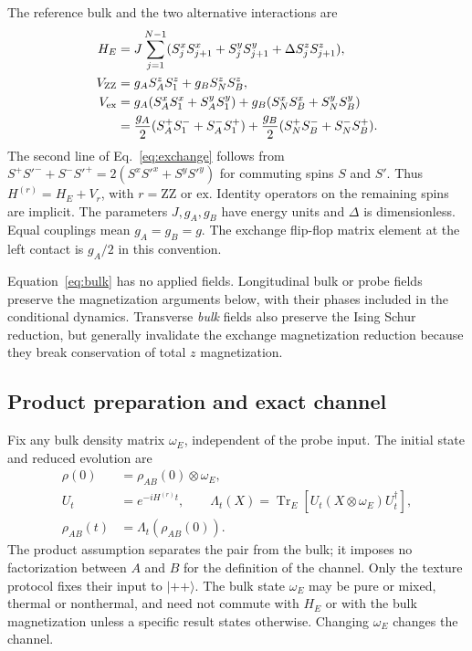 \documentclass[11pt,a4paper]{article}
\newcommand{\ket}[1]{\lvert #1\rangle}
\newcommand{\Tr}{\operatorname{Tr}}
\newcommand{\ZZ}{\mathrm{ZZ}}
\newcommand{\ex}{\mathrm{ex}}
\begin{document}
The reference bulk and the two alternative interactions are
\begin{align}
 H_E&=J\sum_{j=1}^{N-1}
 (S_j^xS_{j+1}^x+S_j^yS_{j+1}^y+\Delta S_j^zS_{j+1}^z),
 \label{eq:bulk}\\
 V_{\ZZ}&=g_A S_A^zS_1^z+g_B S_N^zS_B^z,
 \label{eq:ising}\\
 V_{\ex}&=g_A(S_A^xS_1^x+S_A^yS_1^y)
          +g_B(S_N^xS_B^x+S_N^yS_B^y)\notag\\
 &=\frac{g_A}{2}(S_A^+S_1^-+S_A^-S_1^+)
   +\frac{g_B}{2}(S_N^+S_B^-+S_N^-S_B^+).
 \label{eq:exchange}
\end{align}
The second line of Eq.~\eqref{eq:exchange} follows from
$S^+S'^-+S^-S'^+=2(S^xS'^x+S^yS'^y)$ for commuting spins $S$ and $S'$.
Thus $H^{(r)}=H_E+V_r$, with $r=\ZZ$ or $\ex$.
Identity operators on the remaining spins are implicit. The parameters
$J,g_A,g_B$ have energy units and $\Delta$ is dimensionless. Equal
couplings mean $g_A=g_B=g$. The exchange flip-flop matrix element at
the left contact is $g_A/2$ in this convention.

Equation~\eqref{eq:bulk} has no applied fields. Longitudinal bulk or probe
fields preserve the magnetization arguments below, with their phases
included in the conditional dynamics. Transverse \emph{bulk} fields also
preserve the Ising Schur reduction, but generally invalidate the exchange
magnetization reduction because they break conservation of total
$z$ magnetization.

\subsection{Product preparation and exact channel}

Fix any bulk density matrix $\omega_E$, independent of the probe input.
The initial state and reduced evolution are
\begin{align}
 \rho(0)&=\rho_{AB}(0)\otimes\omega_E,\\
 U_t&=e^{-iH^{(r)}t},\qquad
 \Lambda_t(X)=\Tr_E[U_t(X\otimes\omega_E)U_t^\dagger],
 \label{eq:channel}\\
 \rho_{AB}(t)&=\Lambda_t(\rho_{AB}(0)).
\end{align}
The product assumption separates the pair from the bulk; it imposes no
factorization between $A$ and $B$ for the definition of the channel.
Only the texture protocol fixes their input to $\ket{++}$.
The bulk state $\omega_E$ may be pure or mixed, thermal or nonthermal,
and need not commute with $H_E$ or with the bulk magnetization unless a
specific result states otherwise. Changing $\omega_E$ changes the channel.
\end{document}
